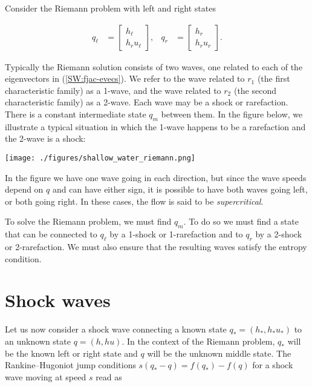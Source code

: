 \documentclass{SIAMbook2016}
\makeatletter
\def\maxwidth{\ifdim\Gin@nat@width>\linewidth\linewidth
    \else\Gin@nat@width\fi}
\let\Oldincludegraphics\includegraphics
\renewcommand{\includegraphics}[1]{\Oldincludegraphics[width=.8\maxwidth]{#1}}
\makeatother
\begin{document}
Consider the Riemann problem with left and right states

\begin{align*}
q_\ell & = \begin{bmatrix} h_\ell \\ h_r u_\ell \end{bmatrix}, &
q_r & = \begin{bmatrix} h_r \\ h_r u_r \end{bmatrix}. 
\end{align*}

Typically the Riemann solution consists of two waves, one related to
each of the eigenvectors in (\ref{SW:fjac-evecs}). We refer to the wave
related to \(r_1\) (the first characteristic family) as a 1-wave, and
the wave related to \(r_2\) (the second characteristic family) as a
2-wave. Each wave may be a shock or rarefaction. There is a constant
intermediate state \(q_m\) between them. In the figure below, we
illustrate a typical situation in which the 1-wave happens to be a
rarefaction and the 2-wave is a shock:

\texttt{[image: ./figures/shallow\_water\_riemann.png]}

In the figure we have one wave going in each direction, but since the
wave speeds depend on \(q\) and can have either sign, it is possible to
have both waves going left, or both going right. In these cases, the
flow is said to be \emph{supercritical}.

To solve the Riemann problem, we must find \(q_m\). To do so we must
find a state that can be connected to \(q_\ell\) by a 1-shock or
1-rarefaction and to \(q_r\) by a 2-shock or 2-rarefaction. We must also
ensure that the resulting waves satisfy the entropy condition.

\hypertarget{shock-waves}{%
\section{Shock waves}\label{shock-waves}}

Let us now consider a shock wave connecting a known state
\(q_*=(h_*, h_* u_*)\) to an unknown state \(q=(h,hu)\). In the context
of the Riemann problem, \(q_*\) will be the known left or right state
and \(q\) will be the unknown middle state. The Rankine--Hugoniot jump
conditions \(s(q_* - q) = f(q_*) - f(q)\) for a shock wave moving at
speed \(s\) read as
\end{document}
